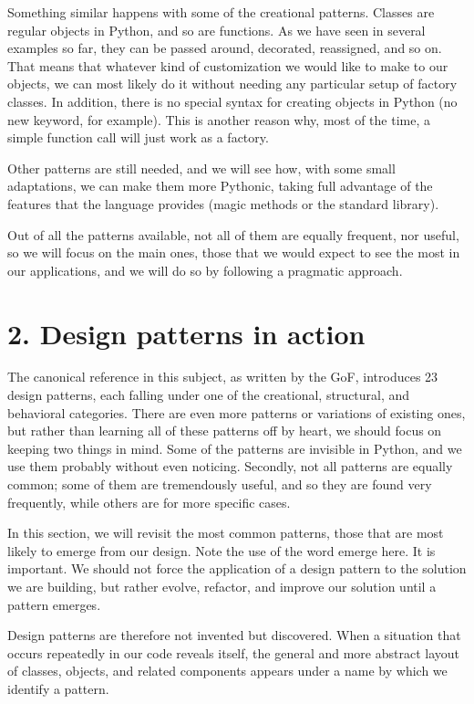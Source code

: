 \documentclass[a4paper,10pt,english]{sphinxmanual}
\begin{document}
Something similar happens with some of the creational patterns. Classes are regular objects
in Python, and so are functions. As we have seen in several examples so far, they can be
passed around, decorated, reassigned, and so on. That means that whatever kind of
customization we would like to make to our objects, we can most likely do it without
needing any particular setup of factory classes. In addition, there is no special syntax for
creating objects in Python (no new keyword, for example). This is another reason why,
most of the time, a simple function call will just work as a factory.

Other patterns are still needed, and we will see how, with some small adaptations, we can
make them more Pythonic, taking full advantage of the features that the language provides
(magic methods or the standard library).

Out of all the patterns available, not all of them are equally frequent, nor useful, so we will
focus on the main ones, those that we would expect to see the most in our applications, and
we will do so by following a pragmatic approach.


\section{2. Design patterns in action}
\label{\detokenize{chapters/9_design_patterns/index:design-patterns-in-action}}
The canonical reference in this subject, as written by the GoF, introduces 23 design patterns,
each falling under one of the creational, structural, and behavioral categories. There are
even more patterns or variations of existing ones, but rather than learning all of these
patterns off by heart, we should focus on keeping two things in mind. Some of the patterns
are invisible in Python, and we use them probably without even noticing. Secondly, not all
patterns are equally common; some of them are tremendously useful, and so they are found
very frequently, while others are for more specific cases.

In this section, we will revisit the most common patterns, those that are most likely to
emerge from our design. Note the use of the word emerge here. It is important. We should
not force the application of a design pattern to the solution we are building, but rather
evolve, refactor, and improve our solution until a pattern emerges.

Design patterns are therefore not invented but discovered. When a situation that occurs
repeatedly in our code reveals itself, the general and more abstract layout of classes, objects,
and related components appears under a name by which we identify a pattern.
\end{document}
